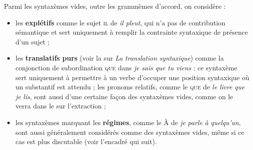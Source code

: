 Parmi les syntaxèmes vides, outre les grammèmes d’accord, on considère :

\begin{itemize}
\item les \textbf{explétifs} comme le sujet \textsc{il} de \textit{il pleut}, qui n’a pas de contribution sémantique et sert uniquement à remplir la contrainte syntaxique de présence d’un sujet ;
\item les \textbf{translatifs purs} (voir la  sur \textit{La translation syntaxique}) comme la conjonction de subordination \textsc{que} dans \textit{je sais que tu viens} : ce syntaxème sert uniquement à permettre à un verbe d’occuper une position syntaxique où un substantif est attendu ; les pronoms relatifs, comme le \textsc{que} de \textit{le livre que je lis}, sont aussi d’une certaine façon des syntaxèmes vides, comme on le verra dans le  sur l’extraction ;
\item les syntaxèmes marquant les \textbf{régimes}, comme le À de \textit{je parle à quelqu’un}, sont aussi généralement considérés comme des syntaxèmes vides, même si ce cas est plus discutable (voir l’encadré qui suit).
\end{itemize}

